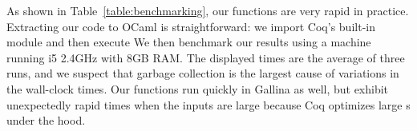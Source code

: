 As shown in Table~\ref{table:benchmarking}, our functions are very rapid in practice.
Extracting our code to OCaml is straightforward: we import Coq's built-in  module and then execute  We then benchmark our results using a machine running i5 2.4GHz with 8GB RAM.  The displayed times are
the average of three runs, and we suspect that garbage collection is the largest cause 
of variations in the wall-clock times.  Our functions run quickly
in Gallina as well, but exhibit unexpectedly rapid times when the inputs are 
large because Coq optimizes large s under the hood.


